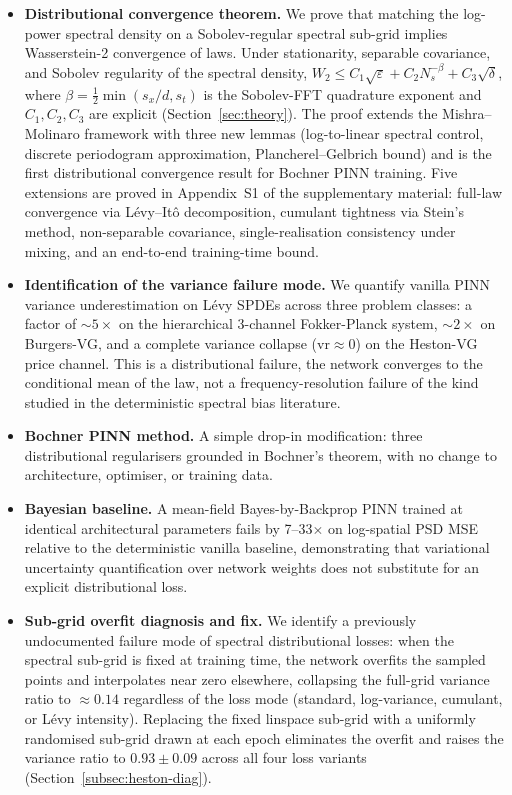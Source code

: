 \documentclass[review,12pt]{elsarticle}
\begin{document}
\begin{itemize}
\item \textbf{Distributional convergence theorem.} We prove that
matching the log-power spectral density on a Sobolev-regular spectral
sub-grid implies Wasserstein-2 convergence of laws. Under stationarity,
separable covariance, and Sobolev regularity of the spectral density,
\(W_2 \leq C_1\sqrt{\varepsilon} + C_2 N_s^{-\beta} + C_3\sqrt{\delta}\),
where \(\beta = \tfrac{1}{2}\min(s_x/d, s_t)\) is the Sobolev-FFT
quadrature exponent and \(C_1, C_2, C_3\) are explicit
(Section~\ref{sec:theory}). The proof extends the Mishra--Molinaro
framework with three new lemmas (log-to-linear spectral control,
discrete periodogram approximation, Plancherel--Gelbrich bound) and is
the first distributional convergence result for Bochner PINN training.
Five extensions are proved in Appendix~S1 of the supplementary material: full-law
convergence via L\'evy--It\^o decomposition, cumulant tightness via
Stein's method, non-separable covariance, single-realisation
consistency under mixing, and an end-to-end training-time bound.

\item \textbf{Identification of the variance failure mode.} We quantify
vanilla PINN variance underestimation on L\'evy SPDEs across three
problem classes: a factor of \(\sim 5\times\) on the hierarchical
3-channel Fokker-Planck system, \(\sim 2\times\) on Burgers-VG, and a
complete variance collapse (\(\mathrm{vr} \approx 0\)) on the
Heston-VG price channel. This is a distributional failure, the
network converges to the conditional mean of the law, not a
frequency-resolution failure of the kind studied in the deterministic
spectral bias literature.

\item \textbf{Bochner PINN method.} A simple drop-in modification:
three distributional regularisers grounded in Bochner's theorem, with
no change to architecture, optimiser, or training data.

\item \textbf{Bayesian baseline.} A mean-field Bayes-by-Backprop PINN
trained at identical architectural parameters fails by 7--33\(\times\)
on log-spatial PSD MSE relative to the deterministic vanilla baseline,
demonstrating that variational uncertainty quantification over network
weights does not substitute for an explicit distributional loss.

\item \textbf{Sub-grid overfit diagnosis and fix.} We identify a
previously undocumented failure mode of spectral distributional
losses: when the spectral sub-grid is fixed at training time, the
network overfits the sampled points and interpolates near zero
elsewhere, collapsing the full-grid variance ratio to \(\approx 0.14\)
regardless of the loss mode (standard, log-variance, cumulant, or
L\'evy intensity). Replacing the fixed linspace sub-grid with a
uniformly randomised sub-grid drawn at each epoch eliminates the
overfit and raises the variance ratio to \(0.93 \pm 0.09\) across all
four loss variants (Section~\ref{subsec:heston-diag}).


\end{itemize}
\end{document}
